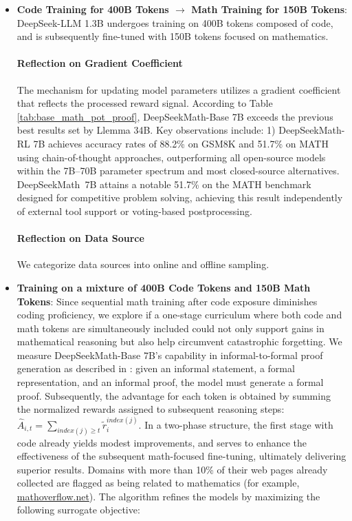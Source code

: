 \begin{itemize}[topsep=0pt]
\begin{itemize}[topsep=0pt]
\begin{itemize}[topsep=0pt]
\begin{itemize}[topsep=0pt]
\begin{itemize}[topsep=0pt]
    \item \textbf{Code Training for 400B Tokens $\rightarrow$ Math Training for 150B Tokens}: DeepSeek-LLM 1.3B undergoes training on 400B tokens composed of code, and is subsequently fine-tuned with 150B tokens focused on mathematics. \paragraph{Reflection on Gradient Coefficient} The mechanism for updating model parameters utilizes a gradient coefficient that reflects the processed reward signal. According to Table \ref{tab:base_math_pot_proof}, DeepSeekMath-Base 7B exceeds the previous best results set by Llemma 34B. Key observations include: 1) DeepSeekMath-RL 7B achieves accuracy rates of 88.2\% on GSM8K and 51.7\% on MATH using chain-of-thought approaches, outperforming all open-source models within the 7B–70B parameter spectrum and most closed-source alternatives. DeepSeekMath~7B attains a notable 51.7\% on the MATH benchmark designed for competitive problem solving, achieving this result independently of external tool support or voting-based postprocessing. \paragraph{Reflection on Data Source} We categorize data sources into online and offline sampling. \item \textbf{Training on a mixture of 400B Code Tokens and 150B Math Tokens}: Since sequential math training after code exposure diminishes coding proficiency, we explore if a one-stage curriculum where both code and math tokens are simultaneously included could not only support gains in mathematical reasoning but also help circumvent catastrophic forgetting. We measure DeepSeekMath-Base 7B’s capability in informal-to-formal proof generation as described in \citep{dsp_proof}: given an informal statement, a formal representation, and an informal proof, the model must generate a formal proof. Subsequently, the advantage for each token is obtained by summing the normalized rewards assigned to subsequent reasoning steps: $\hat{A}_{i, t} = \sum_{index(j) \ge t} \widetilde{r}_i^{index(j)}$. In a two-phase structure, the first stage with code already yields modest improvements, and serves to enhance the effectiveness of the subsequent math-focused fine-tuning, ultimately delivering superior results. Domains with more than 10\% of their web pages already collected are flagged as being related to mathematics (for example, \url{mathoverflow.net}). The algorithm refines the models by maximizing the following surrogate objective:


\end{itemize}
\end{itemize}
\end{itemize}
\end{itemize}
\end{itemize}
